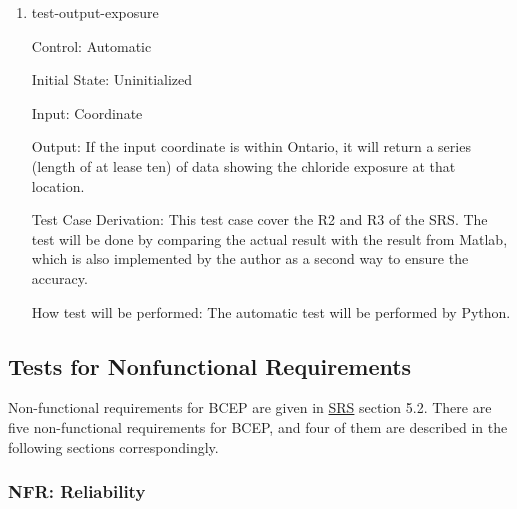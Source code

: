 \documentclass[12pt, titlepage]{article}
\begin{document}
\begin{enumerate}

\item{test-output-exposure\\}

Control: Automatic
					
Initial State: Uninitialized
					
Input: Coordinate
					
Output: If the input coordinate is within Ontario, it will return a series (length of at lease ten) of data showing the chloride exposure at that location.

Test Case Derivation: This test case cover the R2 and R3 of the SRS. The test will be done by comparing the actual result with the result from Matlab, which is also implemented by the author as a second way to ensure the accuracy.

					
How test will be performed: The automatic test will be performed by Python.

\end{enumerate}


\subsection{Tests for Nonfunctional Requirements}\label{TNR}

Non-functional requirements for BCEP are given in \href{https://smiths.github.io/BridgeChlorideExposurePredictor/SRS/SRS.pdf}{SRS} section 5.2. There are five non-functional requirements for BCEP, and four of them are described in the following sections correspondingly.



\subsubsection{NFR: Reliability}\label{t_reliability}
		
\end{document}
